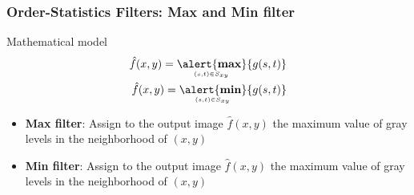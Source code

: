 \documentclass[english,11pt,table,handout]{beamer}
\begin{document}
\frame
{
	\frametitle{Order-Statistics Filters: Max and Min filter}
	
	\begin{block}{Mathematical model}
		\begin{align}
		\nonumber
		\hat{f}(x,y) = \underaccent{(s,t) \in S_{xy}}{\text{\alert{\textbf{max}}}}\{{g(s,t)}\} \\
		\nonumber
		\hat{f}(x,y) = \underaccent{(s,t) \in S_{xy}}{\text{\alert{\textbf{min}}}}\{{g(s,t)}\}
		\end{align}
		
		\begin{itemize}
			\item \alert{\textbf{Max filter}}: Assign to the output image $\hat{f}(x,y)$ the maximum value of gray levels in the neighborhood of $(x,y)$
			\item \alert{\textbf{Min filter}}: Assign to the output image $\hat{f}(x,y)$ the maximum value of gray levels in the neighborhood of $(x,y)$
		\end{itemize}
	\end{block}
}
\end{document}
